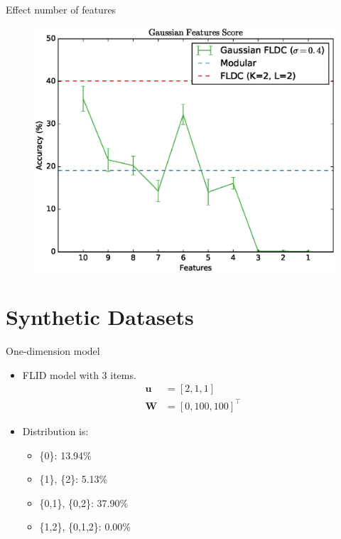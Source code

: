 \documentclass{beamer}
\begin{document}
\begin{frame}{Effect number of features}
  \begin{figure}
    \centering
    \includegraphics[height=0.8\textheight]{gaussian_features_score_size}
  \end{figure}
\end{frame}

\section{Synthetic Datasets}

\begin{frame}{One-dimension model}
  \begin{itemize}
    \item FLID model with 3 items.
    \begin{align*}
      \mathbf{u} &= [2,1,1] \\
      \mathbf{W} &= [0,100,100]^\intercal
    \end{align*}
    \item Distribution is:
      \begin{itemize}
        \item \{0\}: 13.94\%
        \item \{1\}, \{2\}: 5.13\%
        \item \{0,1\}, \{0,2\}: 37.90\%
        \item \{1,2\}, \{0,1,2\}: 0.00\%
      \end{itemize}
  \end{itemize}
\end{frame}
\end{document}
